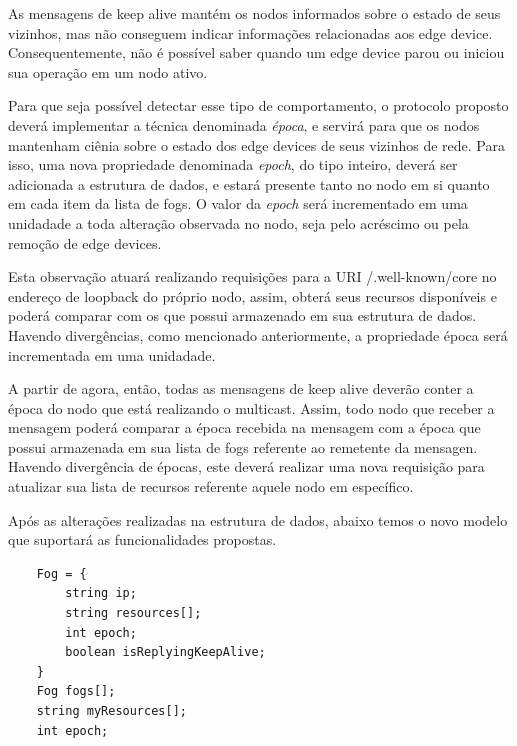 As mensagens de keep alive mantém os nodos informados sobre o estado de seus vizinhos, mas não conseguem indicar informações relacionadas aos edge device.
Consequentemente, não é possível saber quando um edge device parou ou iniciou sua operação em um nodo ativo.

Para que seja possível detectar esse tipo de comportamento, o protocolo proposto deverá implementar a técnica denominada \textit{época},
e servirá para que os nodos mantenham ciênia sobre o estado dos edge devices de seus vizinhos de rede.
Para isso, uma nova propriedade denominada \textit{epoch}, do tipo inteiro, deverá ser adicionada a estrutura de dados, e estará presente tanto no nodo em si quanto em cada item da lista de fogs.
O valor da \textit{epoch} será incrementado em uma unidadade a toda alteração observada no nodo, seja pelo acréscimo ou pela remoção de edge devices.

Esta observação atuará realizando requisições para a URI /.well-known/core no endereço de loopback do próprio nodo,
assim, obterá seus recursos disponíveis e poderá comparar com os que possui armazenado em sua estrutura de dados.
Havendo divergências, como mencionado anteriormente, a propriedade época será incrementada em uma unidadade.

A partir de agora, então, todas as mensagens de keep alive deverão conter a época do nodo que está realizando o multicast.
Assim, todo nodo que receber a mensagem poderá comparar a época recebida na mensagem com a época que possui armazenada em sua lista de fogs referente ao remetente da mensagen.
Havendo divergência de épocas, este deverá realizar uma nova requisição para atualizar sua lista de recursos referente aquele nodo em específico.

Após as alterações realizadas na estrutura de dados, abaixo temos o novo modelo que suportará as funcionalidades propostas.
\begin{verbatim}
    Fog = {
        string ip;
        string resources[];
        int epoch;
        boolean isReplyingKeepAlive;
    }
    Fog fogs[];
    string myResources[];
    int epoch;
\end{verbatim}